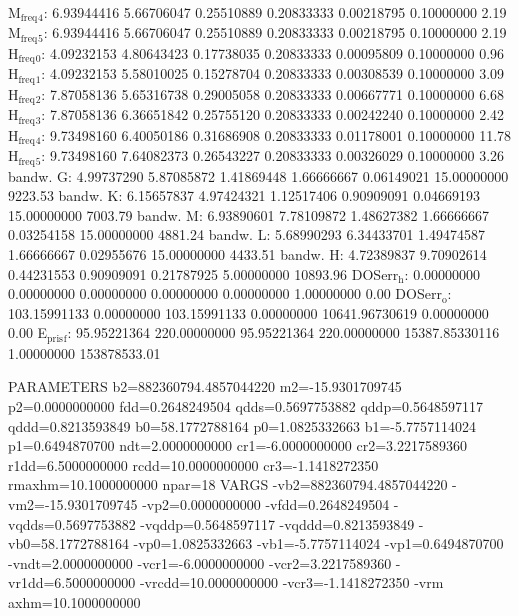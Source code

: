 \documentclass[11pt]{article}
\begin{document}
M\(_{\text{freq}}\)\(_{\text{4}}\):   6.93944416   5.66706047   0.25510889   0.20833333   0.00218795   0.10000000         2.19
M\(_{\text{freq}}\)\(_{\text{5}}\):   6.93944416   5.66706047   0.25510889   0.20833333   0.00218795   0.10000000         2.19
H\(_{\text{freq}}\)\(_{\text{0}}\):   4.09232153   4.80643423   0.17738035   0.20833333   0.00095809   0.10000000         0.96
H\(_{\text{freq}}\)\(_{\text{1}}\):   4.09232153   5.58010025   0.15278704   0.20833333   0.00308539   0.10000000         3.09
H\(_{\text{freq}}\)\(_{\text{2}}\):   7.87058136   5.65316738   0.29005058   0.20833333   0.00667771   0.10000000         6.68
H\(_{\text{freq}}\)\(_{\text{3}}\):   7.87058136   6.36651842   0.25755120   0.20833333   0.00242240   0.10000000         2.42
H\(_{\text{freq}}\)\(_{\text{4}}\):   9.73498160   6.40050186   0.31686908   0.20833333   0.01178001   0.10000000        11.78
H\(_{\text{freq}}\)\(_{\text{5}}\):   9.73498160   7.64082373   0.26543227   0.20833333   0.00326029   0.10000000         3.26
bandw. G:   4.99737290   5.87085872   1.41869448   1.66666667   0.06149021  15.00000000      9223.53
bandw. K:   6.15657837   4.97424321   1.12517406   0.90909091   0.04669193  15.00000000      7003.79
bandw. M:   6.93890601   7.78109872   1.48627382   1.66666667   0.03254158  15.00000000      4881.24
bandw. L:   5.68990293   6.34433701   1.49474587   1.66666667   0.02955676  15.00000000      4433.51
bandw. H:   4.72389837   9.70902614   0.44231553   0.90909091   0.21787925   5.00000000     10893.96
DOSerr\(_{\text{h}}\):   0.00000000   0.00000000   0.00000000   0.00000000   0.00000000   1.00000000         0.00
DOSerr\(_{\text{o}}\): 103.15991133   0.00000000 103.15991133   0.00000000 10641.96730619   0.00000000         0.00
E\(_{\text{pris}}\)\(_{\text{f}}\):  95.95221364 220.00000000  95.95221364 220.00000000 15387.85330116   1.00000000 153878533.01


PARAMETERS
  b2=882360794.4857044220 m2=-15.9301709745 p2=0.0000000000 fdd=0.2648249504 qdds=0.5697753882 qddp=0.5648597117 qddd=0.8213593849 b0=58.1772788164 p0=1.0825332663 b1=-5.7757114024 p1=0.6494870700 ndt=2.0000000000 cr1=-6.0000000000 cr2=3.2217589360 r1dd=6.5000000000 rcdd=10.0000000000 cr3=-1.1418272350 rmaxhm=10.1000000000 npar=18 
VARGS
    -vb2=882360794.4857044220 -vm2=-15.9301709745 -vp2=0.0000000000 -vfdd=0.2648249504 -vqdds=0.5697753882 -vqddp=0.5648597117 -vqddd=0.8213593849 -vb0=58.1772788164 -vp0=1.0825332663 -vb1=-5.7757114024 -vp1=0.6494870700 -vndt=2.0000000000 -vcr1=-6.0000000000 -vcr2=3.2217589360 -vr1dd=6.5000000000 -vrcdd=10.0000000000 -vcr3=-1.1418272350 -vrm
axhm=10.1000000000 
\end{document}
